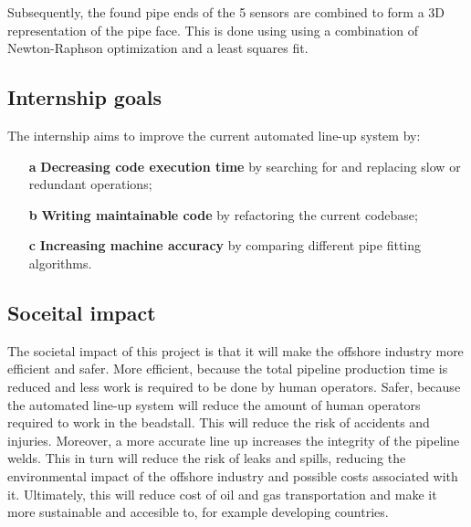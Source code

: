 Subsequently, the found pipe ends of the 5 sensors are combined to form a 3D representation of the pipe face.
This is done using using a combination of Newton-Raphson optimization and a least squares fit.

\subsection{Internship goals} \label{ssec:intern_goals}
The internship aims to improve the current automated line-up system by:
\begin{enumerate}
      \item [\textbf{a}] \textbf{Decreasing code execution time} by searching for and replacing
      slow or redundant operations;
      \item [\textbf{b}] \textbf{Writing maintainable code} by refactoring the current codebase;
      \item [\textbf{c}] \textbf{Increasing machine accuracy} by comparing different pipe fitting algorithms.
\end{enumerate}

\subsection{Soceital impact}
The societal impact of this project is that it will make the offshore industry more efficient and safer. More efficient, because the total pipeline production time is reduced and less work is required to be done by human operators. Safer, because the automated line-up system will reduce the amount of human operators required to work in the beadstall. This will reduce the risk of accidents and injuries. Moreover, a more accurate line up increases the integrity of the pipeline welds. This in turn will reduce the risk of leaks and spills, reducing the environmental impact of the offshore industry and possible costs associated with it. Ultimately, this will reduce cost of oil and gas transportation and make it more sustainable and accesible to, for example developing countries. 